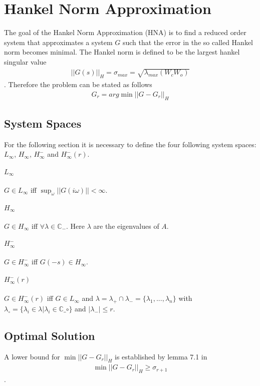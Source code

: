 \section{Hankel Norm Approximation}
The goal of the Hankel Norm Approximation (HNA) is to find a reduced order system that approximates a system \(G\) such that the error in the so called Hankel norm becomes minimal.
The Hankel norm is defined to be the largest hankel singular value
\begin{gather}
||G(s)||_H = \sigma_{max} = \sqrt{\lambda_{max}(W_cW_o)}
\end{gather}
\cite{singh}.
Therefore the problem can be stated as follows
\begin{gather}
G_r = arg\min ||G - G_r||_H \label{hna-prob}
\end{gather}
\subsection{System Spaces}
For the following section it is necessary to define the four following system spaces: \(L_{\infty}\), \(H_{\infty}\), \(H_{\infty}^-\) and \(H_{\infty}^-(r)\).
\paragraph{\(L_{\infty}\)}
\(G \in L_{\infty}\) iff  \(\sup_{\omega}||G(i\omega)|| < \infty\).
\paragraph{\(H_{\infty}\)}
\(G \in H_{\infty}\) iff  \(\forall \lambda \in \mathbb{C}_{-}\).
Here \(\lambda\) are the eigenvalues of \(A\).
\paragraph{\(H_{\infty}^-\)}
\(G \in H_{\infty}^-\) iff \(G(-s) \in H_{\infty}\).
\paragraph{\(H_{\infty}^-(r)\)}
\(G \in H_{\infty}^-(r)\) iff \(G \in L_{\infty}\) and 
\(\lambda = \lambda_+ \cap \lambda_- = \{\lambda_1, ..., \lambda_n \}\) with \(\lambda_{\circ} = \{\lambda_i \in \lambda | \lambda_i \in \mathbb{C}\_{\circ}\}\) and \(|\lambda_-| \leq r\).


\subsection{Optimal Solution}
A lower bound for \(\min ||G - G_r||_H\) is established by lemma 7.1 in \cite{glover84}
\begin{gather}
\min ||G - G_r||_H \geq \sigma_{r+1}
\end{gather}.

